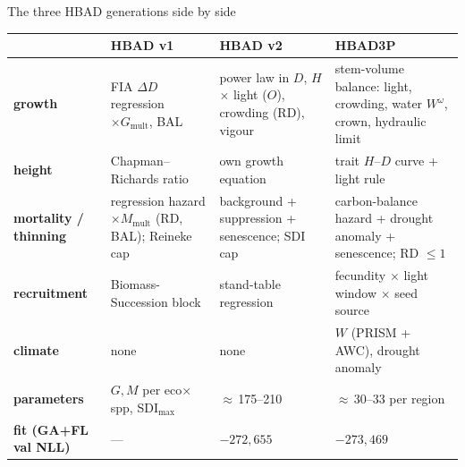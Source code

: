 \begin{frame}{The three HBAD generations side by side}
\scriptsize
\renewcommand{\arraystretch}{1.1}
\begin{tabularx}{\textwidth}{>{\bfseries}l X X X}
\toprule
 & HBAD v1 & HBAD v2 & HBAD3P \\
\midrule
growth & FIA $\Delta D$ regression $\times G_{\text{mult}}$, BAL & power law in $D$, $H$ $\times$ light ($O$), crowding (RD), vigour & stem-volume balance: light, crowding, water $W^{\omega}$, crown, hydraulic limit \\
height & Chapman–Richards ratio & own growth equation & trait $H$–$D$ curve + light rule \\
mortality / thinning & regression hazard $\times M_{\text{mult}}$ (RD, BAL); Reineke cap & background + suppression + senescence; SDI cap & carbon-balance hazard + drought anomaly + senescence; RD $\le1$ \\
recruitment & Biomass-Succession block & stand-table regression & fecundity $\times$ light window $\times$ seed source \\
climate & none & none & $W$ (PRISM + AWC), drought anomaly \\
parameters & $G,M$ per eco$\times$spp, SDI$_{\max}$ & $\approx$\,175–210 & $\approx$\,30–33 per region \\
fit (GA+FL val NLL) & — & $-272{,}655$ & $-273{,}469$ \\
\bottomrule
\end{tabularx}
\end{frame}

